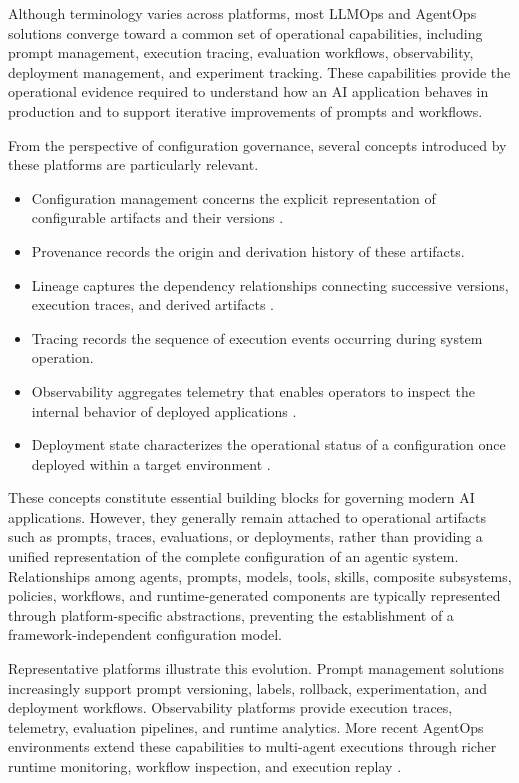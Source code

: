 \documentclass[10pt]{article}
\begin{document}
Although terminology varies across platforms, most LLMOps and AgentOps solutions converge toward a common set of operational capabilities, including prompt management, execution tracing, evaluation workflows, observability, deployment management, and experiment tracking. These capabilities provide the operational evidence required to understand how an AI application behaves in production and to support iterative improvements of prompts and workflows.

From the perspective of configuration governance, several concepts introduced by these platforms are particularly relevant. 

\begin{itemize}
	\item Configuration management concerns the explicit representation of configurable artifacts and their versions \cite{liu2025towards, Hughes03072025, langfusedocs, heliconedocs}. 
	\item Provenance records the origin and derivation history of these artifacts.
	\item Lineage captures the dependency relationships connecting successive versions, execution traces, and derived artifacts \cite{cesarano2026grand, rajath2025review}. 
	\item Tracing records the sequence of execution events occurring during system operation.
	\item Observability \cite{langsmithdocs} aggregates telemetry that enables operators to inspect the internal behavior of deployed applications \cite{opentelemetry}. 
	\item Deployment state characterizes the operational status of a configuration once deployed within a target environment \cite{braintrustdocs}.
\end{itemize}	

These concepts constitute essential building blocks for governing modern AI applications. However, they generally remain attached to operational artifacts such as prompts, traces, evaluations, or deployments, rather than providing a unified representation of the complete configuration of an agentic system. Relationships among agents, prompts, models, tools, skills, composite subsystems, policies, workflows, and runtime-generated components are typically represented through platform-specific abstractions, preventing the establishment of a framework-independent configuration model.

Representative platforms illustrate this evolution. Prompt management solutions increasingly support prompt versioning, labels, rollback, experimentation, and deployment workflows. Observability platforms provide execution traces, telemetry, evaluation pipelines, and runtime analytics. More recent AgentOps environments extend these capabilities to multi-agent executions through richer runtime monitoring, workflow inspection, and execution replay \cite{sahir2026agentops}. 
\end{document}
